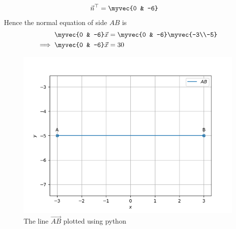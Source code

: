 \documentclass[11pt]{book}
\begin{document}
\begin{enumerate}[label=\thesection.\arabic*.,ref=\thesection.\theenumi]
\begin{align}
  \vec{n}^{\top}&=\myvec{0 & -6}
\end{align}
Hence the normal equation of side $AB$ is 
\begin{align}
    \myvec{0 & -6}\vec{x}&=\myvec{0 & -6}\myvec{-3\\-5}\\
    \implies
    \myvec{0 & -6}\vec{x}&=30
\end{align}
\begin{figure}
\includegraphics [width=\columnwidth] {figs/lineab.png}
\caption{ The line $\vec{AB}$ plotted using python}
\label{fig: lineab}
\end{figure}



\end{enumerate}
\end{document}
